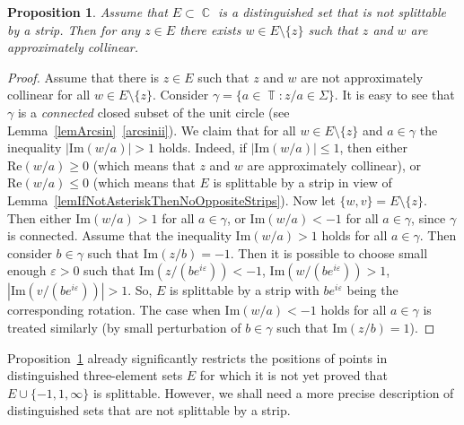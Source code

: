 \documentclass{amsart}
\numberwithin{equation}{section}
\newtheorem{proposition}[theorem]{Proposition}
\theoremstyle{definition}
\theoremstyle{remark}
\DeclareMathOperator{\CC}{\mathbb C}
\DeclareMathOperator{\TT}{\mathbb T}
\begin{document}
	\begin{proposition}\label{propIfSharpNotAsteriskThenStrips}
		Assume that $E \subset \CC$ is a distinguished set that is not splittable by a strip. Then for any $z \in E$ there exists $w \in E \setminus \{z\}$ such that $z$ and $w$ are approximately collinear.
	\end{proposition}
	\begin{proof}
		Assume that there is $z \in E$ such that $z$ and $w$ are not approximately collinear for all $w \in E \setminus \{z\}$. Consider $\gamma = \{a \in \TT: z/a \in \Sigma\}$. It is easy to see that $\gamma$ is a {\it{connected}} closed subset of the unit circle (see Lemma~\ref{lemArcsin}~\ref{arcsinii}). We claim that for all $w \in E\setminus \{z\}$ and $a \in \gamma$ the inequality $|\mathrm{Im}(w/a)| > 1$ holds. Indeed, if $|\mathrm{Im}(w/a)| \le 1$, then either $\mathrm{Re}(w/a) \ge 0$ (which means that $z$ and $w$ are approximately collinear), or $\mathrm{Re}(w/a) \le 0$ (which means that $E$ is splittable by a strip in view of Lemma~\ref{lemIfNotAsteriskThenNoOppositeStrips}). Now let $\{w, v\} = E\setminus \{z\}$. Then either $\mathrm{Im}(w/a) > 1$ for all $a \in \gamma$, or $\mathrm{Im}(w/a) < -1$ for all $a \in \gamma$, since $\gamma$ is connected. Assume that the inequality $\mathrm{Im}(w/a) > 1$ holds for all $a \in \gamma$. Then consider $b \in \gamma$ such that $\mathrm{Im}(z/b) = -1$. Then it is possible to choose small enough $\varepsilon > 0$ such that $\mathrm{Im}(z/(be^{i\varepsilon})) < -1$, $\mathrm{Im}(w/(be^{i\varepsilon})) > 1$, $|\mathrm{Im}(v/(be^{i\varepsilon}))| > 1$. So, $E$ is splittable by a strip with $be^{i\varepsilon}$ being the corresponding rotation. The case when $\mathrm{Im}(w/a) < -1$ holds for all $a \in \gamma$ is treated similarly (by small perturbation of $b \in \gamma$ such that $\mathrm{Im}(z/b) = 1$).
	\end{proof}
	
	Proposition~\ref{propIfSharpNotAsteriskThenStrips} already significantly restricts the positions of points in distinguished three-element sets $E$ for which it is not yet proved that $E \cup \{-1, 1, \infty\}$ is splittable. However, we shall need a more precise description of distinguished sets that are not splittable by a strip.
	
\end{document}
